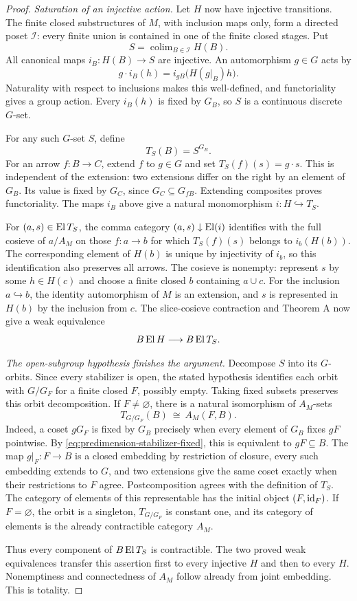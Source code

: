 \begin{proof}
\emph{Saturation of an injective action.}
Let $H$ now have injective transitions. The finite closed
substructures of $M$, with inclusion maps only, form a directed
poset $\mathcal I$: every finite union is contained in one of the
finite closed stages. Put
\[
                         S=\operatorname{colim}_{B\in\mathcal I} H(B).
\]
All canonical maps $i_B:H(B)\to S$ are injective. An automorphism
$g\in G$ acts by
\[
                   g\cdot i_B(h)=i_{gB}\bigl(H(g|_B)h\bigr).
\]
Naturality with respect to inclusions makes this well-defined, and
functoriality gives a group action. Every $i_B(h)$ is fixed by
$G_B$, so $S$ is a continuous discrete $G$-set.

For any such $G$-set $S$, define
\[
                         T_S(B)=S^{G_B}.
\]
For an arrow $f:B\to C$, extend $f$ to $g\in G$ and set
$T_S(f)(s)=g\cdot s$. This is independent of the extension:
two extensions differ on the right by an element of $G_B$.
Its value is fixed by $G_C$, since $G_C\subseteq G_{fB}$.
Extending composites proves functoriality. The maps $i_B$ above
give a natural monomorphism $i:H\hookrightarrow T_S$.

For $(a,s)\in\operatorname{El} T_S$, the comma category
$(a,s)\downarrow\operatorname{El}(i)$ identifies with the full cosieve of
$a/A_M$ on those $f:a\to b$ for which
$T_S(f)(s)$ belongs to $i_b(H(b))$. The corresponding element of
$H(b)$ is unique by injectivity of $i_b$, so this identification
also preserves all arrows. The cosieve is nonempty: represent
$s$ by some $h\in H(c)$ and choose a finite closed $b$ containing
$a\cup c$. For the inclusion $a\hookrightarrow b$, the identity
automorphism of $M$ is an extension, and $s$ is represented in
$H(b)$ by the inclusion from $c$. The slice-cosieve contraction
and Theorem A now give a weak equivalence
\[
                      B\operatorname{El} H\longrightarrow B\operatorname{El} T_S.
\]

\emph{The open-subgroup hypothesis finishes the argument.}
Decompose $S$ into its $G$-orbits. Since every stabilizer is open,
the stated hypothesis identifies each orbit with $G/G_F$ for a
finite closed $F$, possibly empty. Taking fixed subsets preserves
this orbit decomposition. If $F\ne\varnothing$, there is a natural
isomorphism of $A_M$-sets
\[
                   T_{G/G_F}(B)\ \cong\ A_M(F,B).
\]
Indeed, a coset $gG_F$ is fixed by $G_B$ precisely when every
element of $G_B$ fixes $gF$ pointwise. By
\eqref{eq:predimension-stabilizer-fixed}, this is equivalent to
$gF\subseteq B$. The map $g|_F:F\to B$ is a closed embedding by
restriction of closure, every such embedding extends to $G$, and
two extensions give the same coset exactly when their restrictions
to $F$ agree. Postcomposition agrees with the definition of $T_S$.
The category of elements of this representable has the initial
object $(F,\mathrm{id}_F)$. If $F=\varnothing$, the orbit is a singleton,
$T_{G/G_F}$ is constant one, and its category of elements is the
already contractible category $A_M$.

Thus every component of $B\operatorname{El} T_S$ is contractible. The two
proved weak equivalences transfer this assertion first to every
injective $H$ and then to every $H$. Nonemptiness and connectedness
of $A_M$ follow already from joint embedding. This is totality.
\end{proof}

